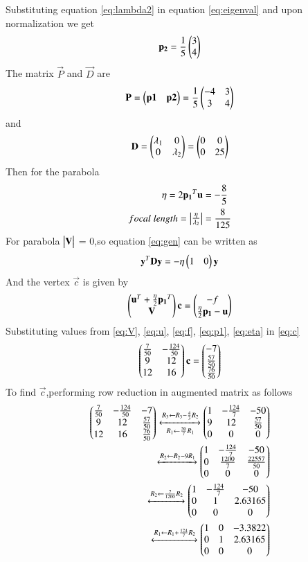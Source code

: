 \documentclass[journal,12pt,twocolumn]{IEEEtran}
\begin{document}
Substituting equation \eqref{eq:lambda2} in equation \eqref{eq:eigenval} and upon normalization we get
\begin{align}
    \mathbf{p_2} = \frac{1}{5}\begin{pmatrix}3\\4\end{pmatrix}
\end{align}
The matrix $\vec{P}$ and $\vec{D}$ are
\begin{align}
    \mathbf{P} = \begin{pmatrix}\mathbf{p1}&\mathbf{p2}\end{pmatrix}=\frac{1}{5}\begin{pmatrix}-4&3\\3&4\end{pmatrix}
\end{align}
and
\begin{align}
    \mathbf{D} = \begin{pmatrix}\lambda_1&0\\0&\lambda_2\end{pmatrix} = \begin{pmatrix}0&0\\0&25\end{pmatrix}
\end{align}
Then for the parabola
\begin{align}
    \eta = 2\mathbf{p_1}^T\mathbf{u}&=-\frac{8}{5}\label{eq:eta}\\
    focal\;length =\begin{vmatrix}\frac{\eta}{\lambda_2}\end{vmatrix}&=\frac{8}{125}
\end{align}
For parabola $\begin{vmatrix}\mathbf{V}\end{vmatrix}$ = 0,so equation \eqref{eq:gen} can be written as
\begin{align}
    \mathbf{y}^T\mathbf{D}\mathbf{y}=-\eta\begin{pmatrix}1&0\end{pmatrix}\mathbf{y}
\end{align}
And the vertex $\vec{c}$ is given by
\begin{align}
    \begin{pmatrix}\mathbf{u}^T+\frac{\eta}{2}\mathbf{p_1}^T\\\mathbf{V}\end{pmatrix}\mathbf{c}=\begin{pmatrix}-f\\\frac{\eta}{2}\mathbf{p_1}-\mathbf{u}\end{pmatrix}\label{eq:c}
\end{align}
Substituting values from \eqref{eq:V}, \eqref{eq:u}, \eqref{eq:f}, \eqref{eq:p1}, \eqref{eq:eta} in \eqref{eq:c}
\begin{align}
    \begin{pmatrix}\frac{7}{50}&-\frac{124}{50}\\9&12\\12&16\end{pmatrix}\mathbf{c}=\begin{pmatrix}-7\\\frac{57}{50}\\\frac{76}{50}\end{pmatrix}
\end{align}
To find $\vec{c}$,performing row reduction in augmented matrix as follows
\begin{align*}
    \begin{pmatrix}\frac{7}{50}&-\frac{124}{50}&-7\\9&12&\frac{57}{50}\\12&16&\frac{76}{50}\end{pmatrix}\xleftrightarrow[R_1\leftarrow \frac{50}{7}R_1]{R_3\leftarrow R_3-\frac{4}{3}R_2}\begin{pmatrix}1&-\frac{124}{7}&-50\\9&12&\frac{57}{50}\\0&0&0\end{pmatrix}\\
    \xleftrightarrow{R_2\leftarrow R_2-9R_1}\begin{pmatrix}1&-\frac{124}{7}&-50\\0&\frac{1200}{7}&\frac{22557}{50}\\0&0&0\end{pmatrix}\\
    \xleftrightarrow{R_2\leftarrow\frac{7}{1200}R_2}\begin{pmatrix}1&-\frac{124}{7}&-50\\0&1&2.63165\\0&0&0\end{pmatrix}\\
    \xleftrightarrow{R_1\leftarrow R_1+\frac{124}{7}R_2}\begin{pmatrix}1&0&-3.3822\\0&1&2.63165\\0&0&0\end{pmatrix}
\end{align*}
\end{document}

